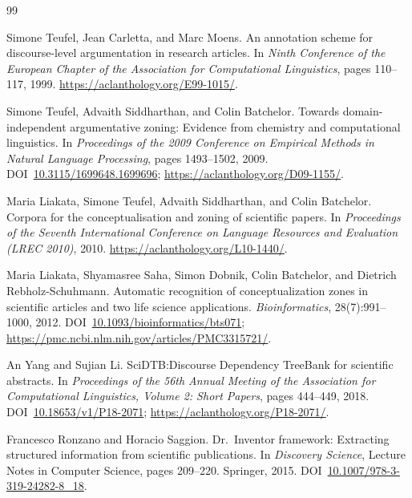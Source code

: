 \begin{thebibliography}{99}

Simone Teufel, Jean Carletta, and Marc Moens.
\newblock An annotation scheme for discourse-level argumentation in research articles.
\newblock In \emph{Ninth Conference of the European Chapter of the Association for Computational Linguistics}, pages 110--117, 1999.
\newblock \url{https://aclanthology.org/E99-1015/}.

Simone Teufel, Advaith Siddharthan, and Colin Batchelor.
\newblock Towards domain-independent argumentative zoning: Evidence from chemistry and computational linguistics.
\newblock In \emph{Proceedings of the 2009 Conference on Empirical Methods in Natural Language Processing}, pages 1493--1502, 2009.
\newblock DOI~\href{https://doi.org/10.3115/1699648.1699696}{10.3115/1699648.1699696}; \url{https://aclanthology.org/D09-1155/}.

Maria Liakata, Simone Teufel, Advaith Siddharthan, and Colin Batchelor.
\newblock Corpora for the conceptualisation and zoning of scientific papers.
\newblock In \emph{Proceedings of the Seventh International Conference on Language Resources and Evaluation (LREC 2010)}, 2010.
\newblock \url{https://aclanthology.org/L10-1440/}.

Maria Liakata, Shyamasree Saha, Simon Dobnik, Colin Batchelor, and Dietrich Rebholz-Schuhmann.
\newblock Automatic recognition of conceptualization zones in scientific articles and two life science applications.
\newblock \emph{Bioinformatics}, 28(7):991--1000, 2012.
\newblock DOI~\href{https://doi.org/10.1093/bioinformatics/bts071}{10.1093/bioinformatics/bts071}; \url{https://pmc.ncbi.nlm.nih.gov/articles/PMC3315721/}.

An Yang and Sujian Li.
\newblock SciDTB:\@ Discourse Dependency TreeBank for scientific abstracts.
\newblock In \emph{Proceedings of the 56th Annual Meeting of the Association for Computational Linguistics, Volume 2: Short Papers}, pages 444--449, 2018.
\newblock DOI~\href{https://doi.org/10.18653/v1/P18-2071}{10.18653/v1/P18-2071}; \url{https://aclanthology.org/P18-2071/}.

Francesco Ronzano and Horacio Saggion.
\newblock Dr.~Inventor framework: Extracting structured information from scientific publications.
\newblock In \emph{Discovery Science}, Lecture Notes in Computer Science, pages 209--220. Springer, 2015.
\newblock DOI~\href{https://doi.org/10.1007/978-3-319-24282-8_18}{10.1007/978-3-319-24282-8\_18}.


\end{thebibliography}
